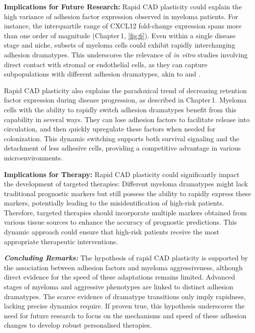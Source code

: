\textbf{Implications for Future Research:}
Rapid \ac{CAD} plasticity could explain the high variance of adhesion factor
expression observed in myeloma patients. For instance, the interquartile range
of CXCL12 fold-change expression spans more than one order of magnitude
(Chapter\,1, \autoref{fig:6}). Even within a single disease stage and niche,
subsets of myeloma cells could exhibit rapidly interchanging adhesion dramatypes.
This underscores the relevance of \textit{in vitro} studies involving direct
contact with stromal or endothelial cells, as they can capture subpopulations
with different adhesion dramatypes, akin to \MAina and \nMAina.

Rapid \ac{CAD} plasticity also explains the paradoxical trend of decreasing
retention factor expression during disease progression, as described in
Chapter\,1. Myeloma cells with the ability to rapidly switch adhesion dramatypes
benefit from this capability in several ways. They can lose adhesion factors to
facilitate release into circulation, and then quickly upregulate these factors
when needed for colonization. This dynamic switching supports both survival
signaling and the detachment of less adhesive cells, providing a competitive
advantage in various microenvironments.


\textbf{Implications for Therapy:}
Rapid \ac{CAD} plasticity could significantly impact the development of targeted
therapies: Different myeloma dramatypes might lack traditional prognostic
markers but still possess the ability to rapidly express these markers,
potentially leading to the misidentification of high-risk patients. Therefore,
targeted therapies should incorporate multiple markers obtained from various
tissue sources to enhance the accuracy of prognostic predictions. This
dynamic approach could ensure that high-risk patients receive the most
appropriate therapeutic interventions.



\textbf{\textit{Concluding Remarks:}} The hypothesis of rapid \ac{CAD}
plasticity is supported by the association between adhesion factors and myeloma
aggressiveness, although direct evidence for the speed of these adaptations
remains limited. Advanced stages of myeloma and aggressive phenotypes are linked
to distinct adhesion dramatypes. The scarce evidence of dramatype transitions
only imply rapidness, lacking precise dynamics require. If proven true, this
hypothesis underscores the need for future research to focus on the mechanisms
and speed of these adhesion changes to develop robust personalised therapies.




